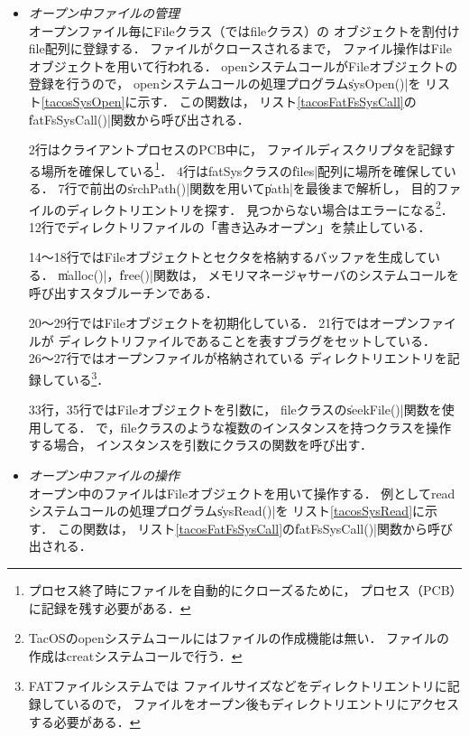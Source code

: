 \begin{itemize}
\item \emph{オープン中ファイルの管理} \\
  オープンファイル毎にFileクラス（ではfileクラス）の
  オブジェクトを割付けfile配列に登録する．
  ファイルがクロースされるまで，
  ファイル操作はFileオブジェクトを用いて行われる．
  openシステムコールがFileオブジェクトの登録を行うので，
  openシステムコールの処理プログラム\|sysOpen()|を
  リスト\ref{tacosSysOpen}に示す．
  この関数は，
  リスト\ref{tacosFatFsSysCall}の\|fatFsSysCall()|関数から呼び出される．

  

  2行はクライアントプロセスのPCB中に，
  ファイルディスクリプタを記録する場所を確保している\footnote{
    プロセス終了時にファイルを自動的にクローズるために，
    プロセス（PCB）に記録を残す必要がある．}．
  4行はfatSysクラスの\|files|配列に場所を確保している．
  7行で前出の\|srchPath()|関数を用いて\|path|を最後まで解析し，
  目的ファイルのディレクトリエントリを探す．
  見つからない場合はエラーになる\footnote{
    TacOSのopenシステムコールにはファイルの作成機能は無い．
    ファイルの作成はcreatシステムコールで行う．}．
  12行でディレクトリファイルの「書き込みオープン」を禁止している．
  
  14〜18行ではFileオブジェクトとセクタを格納するバッファを生成している．
  \|malloc()|，\|free()|関数は，
  メモリマネージャサーバのシステムコールを呼び出すスタブルーチンである．

  20〜29行ではFileオブジェクトを初期化している．
  21行ではオープンファイルが
  ディレクトリファイルであることを表すブラグをセットしている．
  26〜27行ではオープンファイルが格納されている
  ディレクトリエントリを記録している\footnote{
    FATファイルシステムでは
    ファイルサイズなどをディレクトリエントリに記録しているので，
    ファイルをオープン後もディレクトリエントリにアクセスする必要がある．}．
  
  33行，35行ではFileオブジェクトを引数に，
  fileクラスの\|seekFile()|関数を使用してる．
  {\cmml}で，fileクラスのような複数のインスタンスを持つクラスを操作する場合，
  インスタンスを引数にクラスの関数を呼び出す．

\item \emph{オープン中ファイルの操作} \\
  オープン中のファイルはFileオブジェクトを用いて操作する．
  例としてreadシステムコールの処理プログラム\|sysRead()|を
  リスト\ref{tacosSysRead}に示す．
  この関数は，
  リスト\ref{tacosFatFsSysCall}の\|fatFsSysCall()|関数から呼び出される．


\end{itemize}

